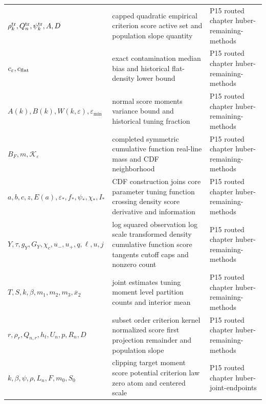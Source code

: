 \begin{longtable}{@{}p{}p{}p{}@{}}
\(\rho_k^{\rm tr},\allowbreak Q_n^{\rm tr},\allowbreak \psi_k^{\rm tr},\allowbreak A,\allowbreak D\) & capped quadratic empirical criterion score active set and population slope quantity & P15 routed chapter huber-\allowbreak{}remaining-\allowbreak{}methods \\
\(c_\varepsilon,\allowbreak c_{\rm flat}\) & exact contamination median bias and historical flat-density lower bound & P15 routed chapter huber-\allowbreak{}remaining-\allowbreak{}methods \\
\(A(k),\allowbreak B(k),\allowbreak W(k,\allowbreak \varepsilon),\allowbreak \varepsilon_{\min}\) & normal score moments variance bound and historical tuning fraction & P15 routed chapter huber-\allowbreak{}remaining-\allowbreak{}methods \\
\(B_F,\allowbreak m,\allowbreak \mathcal K_\varepsilon\) & completed symmetric cumulative function real-line mass and CDF neighborhood & P15 routed chapter huber-\allowbreak{}remaining-\allowbreak{}methods \\
\(a,\allowbreak b,\allowbreak c,\allowbreak z,\allowbreak E(a),\allowbreak \varepsilon_*,\allowbreak f_*,\allowbreak \psi_*,\allowbreak \chi_*,\allowbreak I_*\) & CDF construction joins core parameter tuning function crossing density score derivative and information & P15 routed chapter huber-\allowbreak{}remaining-\allowbreak{}methods \\
\(Y,\allowbreak \tau,\allowbreak g_Y,\allowbreak G_Y,\allowbreak \chi_c,\allowbreak u_-,\allowbreak u_+,\allowbreak q,\allowbreak \ell,\allowbreak u,\allowbreak j\) & log squared observation log scale transformed density cumulative function score tangents cutoff caps and nonzero count & P15 routed chapter huber-\allowbreak{}remaining-\allowbreak{}methods \\
\(T,\allowbreak S,\allowbreak k,\allowbreak \beta,\allowbreak m_1,\allowbreak m_2,\allowbreak m_3,\allowbreak \overline x_2\) & joint estimates tuning moment level partition counts and interior mean & P15 routed chapter huber-\allowbreak{}remaining-\allowbreak{}methods \\
\(r,\allowbreak \rho_r,\allowbreak Q_{n,r},\allowbreak h_t,\allowbreak U_n,\allowbreak p,\allowbreak R_n,\allowbreak D\) & subset order criterion kernel normalized score first projection remainder and population slope & P15 routed chapter huber-\allowbreak{}remaining-\allowbreak{}methods \\
\(k,\allowbreak \beta,\allowbreak \psi,\allowbreak \rho,\allowbreak L_n,\allowbreak F,\allowbreak m_0,\allowbreak S_0\) & clipping target moment score potential criterion law zero atom and centered scale & P15 routed chapter huber-\allowbreak{}joint-\allowbreak{}endpoints \\

\end{longtable}
